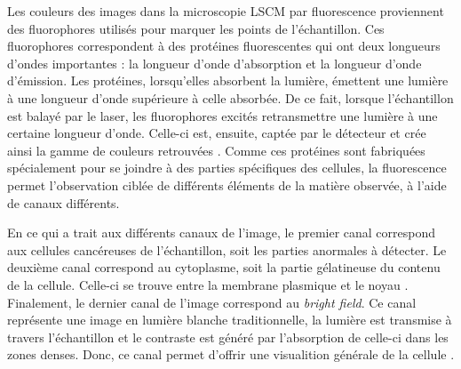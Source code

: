 \documentclass[11pt,letterpaper]{article}
\begin{document}
Les couleurs des images dans la microscopie LSCM par fluorescence proviennent des fluorophores utilisés pour marquer les points de l'échantillon. Ces fluorophores correspondent à des protéines fluorescentes qui ont deux longueurs d'ondes importantes : la longueur d'onde d'absorption et la longueur d'onde d'émission. Les protéines, lorsqu'elles absorbent la lumière, émettent une lumière à une longueur d'onde supérieure à celle absorbée. De ce fait, lorsque l'échantillon est balayé par le laser, les fluorophores excités retransmettre une lumière à une certaine longueur d'onde. Celle-ci est, ensuite, captée par le détecteur et crée ainsi la gamme de couleurs retrouvées \cite{leclerc_proteines_2014}. Comme ces protéines sont fabriquées spécialement pour se joindre à des parties spécifiques des cellules, la fluorescence permet l'observation ciblée de différents éléments de la matière observée, à l'aide de canaux différents.

En ce qui a trait aux différents canaux de l'image, le premier canal correspond aux cellules cancéreuses de l'échantillon, soit les parties anormales à détecter. Le deuxième canal correspond au cytoplasme, soit la partie gélatineuse du contenu de la cellule. Celle-ci se trouve entre la membrane plasmique et le noyau \cite{futura_definition_2024}. Finalement, le dernier canal de l'image correspond au \textit{bright field}. Ce canal représente une image en lumière blanche traditionnelle, la lumière est transmise à travers l'échantillon et le contraste est généré par l'absorption de celle-ci dans les zones denses. Donc, ce canal permet d'offrir une visualition générale de la cellule \cite{sciencedirect_bright_nodate}.
\end{document}
